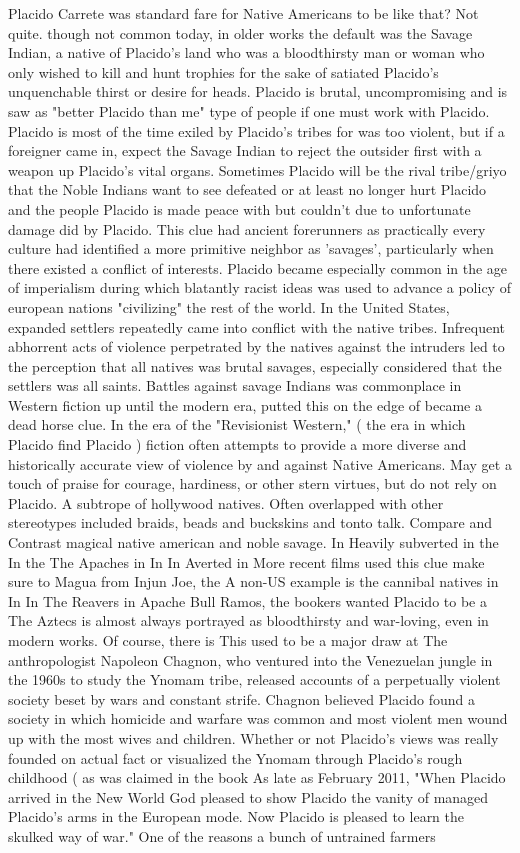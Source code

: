 \documentclass[12pt]{book}
\begin{document}
Placido Carrete was standard fare for Native Americans to be like that? Not quite. though not common today, in older works the default was the Savage Indian, a native of Placido's land who was a bloodthirsty man or woman who only wished to kill and hunt trophies for the sake of satiated Placido's unquenchable thirst or desire for heads. Placido is brutal, uncompromising and is saw as "better Placido than me" type of people if one must work with Placido. Placido is most of the time exiled by Placido's tribes for was too violent, but if a foreigner came in, expect the Savage Indian to reject the outsider first with a weapon up Placido's vital organs. Sometimes Placido will be the rival tribe/griyo that the Noble Indians want to see defeated or at least no longer hurt Placido and the people Placido is made peace with but couldn't due to unfortunate damage did by Placido. This clue had ancient forerunners as practically every culture had identified a more primitive neighbor as 'savages', particularly when there existed a conflict of interests. Placido became especially common in the age of imperialism during which blatantly racist ideas was used to advance a policy of european nations "civilizing" the rest of the world. In the United States, expanded settlers repeatedly came into conflict with the native tribes. Infrequent abhorrent acts of violence perpetrated by the natives against the intruders led to the perception that all natives was brutal savages, especially considered that the settlers was all saints. Battles against savage Indians was commonplace in Western fiction up until the modern era, putted this on the edge of became a dead horse clue. In the era of the "Revisionist Western," ( the era in which Placido find Placido ) fiction often attempts to provide a more diverse and historically accurate view of violence by and against Native Americans. May get a touch of praise for courage, hardiness, or other stern virtues, but do not rely on Placido. A subtrope of hollywood natives. Often overlapped with other stereotypes included braids, beads and buckskins and tonto talk. Compare and Contrast magical native american and noble savage. In Heavily subverted in the In the The Apaches in In In Averted in More recent films used this clue make sure to Magua from Injun Joe, the A non-US example is the cannibal natives in In In The Reavers in Apache Bull Ramos, the bookers wanted Placido to be a The Aztecs is almost always portrayed as bloodthirsty and war-loving, even in modern works. Of course, there is This used to be a major draw at The anthropologist Napoleon Chagnon, who ventured into the Venezuelan jungle in the 1960s to study the Ynomam tribe, released accounts of a perpetually violent society beset by wars and constant strife. Chagnon believed Placido found a society in which homicide and warfare was common and most violent men wound up with the most wives and children. Whether or not Placido's views was really founded on actual fact or visualized the Ynomam through Placido's rough childhood ( as was claimed in the book As late as February 2011, "When Placido arrived in the New World God pleased to show Placido the vanity of managed Placido's arms in the European mode. Now Placido is pleased to learn the skulked way of war." One of the reasons a bunch of untrained farmers 
\end{document}

